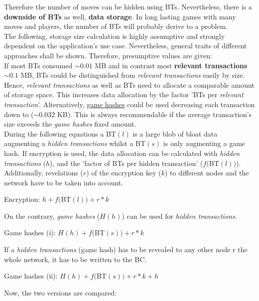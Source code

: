 Therefore the number of moves can be hidden using \gls{BT}s.
Nevertheless, there is a \textbf{downside of \gls{BT}s} as well, \textbf{data storage}.
In long lasting games with many moves and players, the number of \gls{BT}s will probably derive to a problem. \\
The following, storage size calculation is highly assumptive and strongly dependent on the application's use case.
Nevertheless, general traits of different approaches shall be shown.
Therefore, presumptive values are given: \\
If most \gls{BT}s consumed $\sim0.01$ MB and in contrast most \textbf{relevant transactions} $\sim0.1$ MB,
\gls{BT}s could be distinguished from \textit{relevant transactions} easily by size.
Hence, \textit{relevant transactions} as well as \gls{BT}s need to allocate a comparable amount of storage space.
This increases data allocation by the factor '\gls{BT}s per \textit{relevant transaction}'.
Alternatively, \hyperref[def:GameHash]{game hashes} could be used decreasing each transaction down to ($\sim0.032$ KB).
This is always recommendable if the average transaction's size exceeds the \textit{game hashes} fixed amount. \\
During the following equations a \gls{BT}$(l)$ is a large blob of bloat data augmenting a \textit{hidden transactions} whilst a \gls{BT}$(s)$ is only augmenting a game hash.
If encryption is used, the data allocation can be calculated with \textit{hidden transactions} ($h$), and the 'factor of \gls{BT}s per hidden transaction' ($f($\gls{BT}$(l))$).
Additionally, revelations ($r$) of the encryption key ($k$) to different nodes and the network have to be taken into account.
\begin{center}
	Encryption: \hspace{0.2cm} $h + f($\gls{BT}$(l)) + r * k$
\end{center}
On the contrary, \textit{game hashes} ($H(h)$) can be used for \textit{hidden transactions}.
\begin{center}
	Game hashes (i): \hspace{0.2cm} $H(h) + f($\gls{BT}$(s)) + r * k$
\end{center}
If a \textit{hidden transactions} (game hash) has to be revealed to any other node r the whole network, it has to be written to the \gls{BC}.
\begin{center}
	Game hashes (ii): \hspace{0.2cm} $H(h) + f($\gls{BT}$(s)) + r * k + h$
\end{center}
Now, the two versions are compared:
